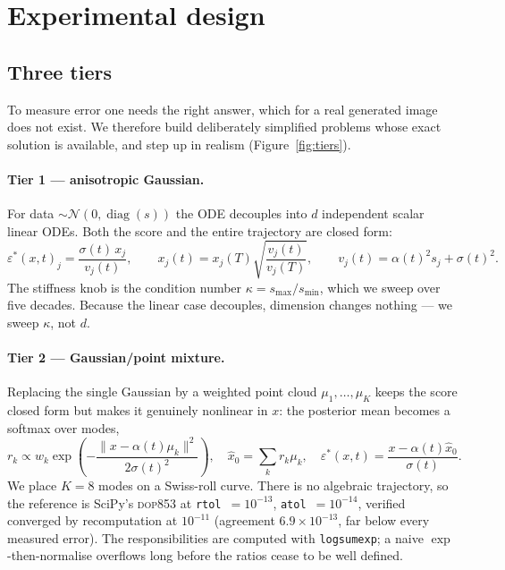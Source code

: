 \documentclass[11pt,a4paper]{article}
\newcommand{\eps}{\varepsilon}
\begin{document}
\section{Experimental design}

\subsection{Three tiers}

To measure error one needs the right answer, which for a real generated image
does not exist. We therefore build deliberately simplified problems whose exact
solution is available, and step up in realism (Figure~\ref{fig:tiers}).

\paragraph{Tier 1 --- anisotropic Gaussian.}
For data $\sim\mathcal N(0,\operatorname{diag}(s))$ the ODE decouples into $d$
independent scalar linear ODEs. Both the score and the entire trajectory are
closed form:
\begin{equation}
\eps^{*}(x,t)_j = \frac{\sigma(t)\,x_j}{v_j(t)},\qquad
x_j(t) = x_j(T)\sqrt{\frac{v_j(t)}{v_j(T)}},\qquad
v_j(t) = \alpha(t)^2 s_j + \sigma(t)^2 .
\end{equation}
The stiffness knob is the condition number $\kappa = s_{\max}/s_{\min}$, which
we sweep over five decades. Because the linear case decouples, dimension changes
nothing --- we sweep $\kappa$, not $d$.

\paragraph{Tier 2 --- Gaussian/point mixture.}
Replacing the single Gaussian by a weighted point cloud $\mu_1,\dots,\mu_K$
keeps the score closed form but makes it genuinely nonlinear in $x$: the
posterior mean becomes a softmax over modes,
\begin{equation}
r_k \propto w_k \exp\!\left(-\frac{\lVert x-\alpha(t)\mu_k\rVert^2}{2\sigma(t)^2}\right),
\quad \hat x_0 = \sum_k r_k \mu_k,
\quad \eps^{*}(x,t) = \frac{x-\alpha(t)\hat x_0}{\sigma(t)} .
\end{equation}
We place $K=8$ modes on a Swiss-roll curve. There is no algebraic trajectory, so
the reference is SciPy's \textsc{dop853} at \texttt{rtol}~$=10^{-13}$,
\texttt{atol}~$=10^{-14}$, verified converged by recomputation at $10^{-11}$
(agreement $6.9\times10^{-13}$, far below every measured error). The
responsibilities are computed with \texttt{logsumexp}; a naive
$\exp$-then-normalise overflows long before the ratios cease to be well defined.
\end{document}
